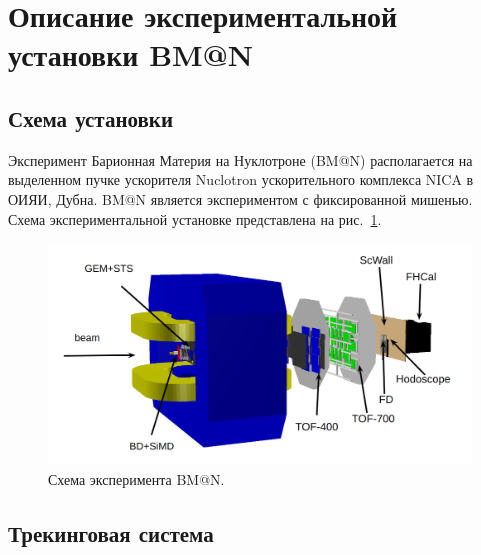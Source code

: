 \section{Описание экспериментальной установки BM@N}

\subsection{Схема установки}

Эксперимент Барионная Материя на Нуклотроне (BM@N) располагается на выделенном пучке ускорителя Nuclotron ускорительного комплекса NICA в ОИЯИ, Дубна.
BM@N является экспериментом с фиксированной мишенью.
Схема экспериментальной установке представлена на рис.~\ref{fig:bmn_layout}.
%
\begin{figure}[ht]
\begin{center}
\includegraphics[width=0.95\linewidth]{images/BM@N_layout.png}
\caption{Схема эксперимента BM@N.}
\label{fig:bmn_layout}
\end{center}
\end{figure}

\subsection{Трекинговая система}

